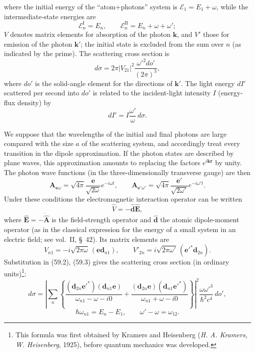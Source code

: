 where the initial energy of the ``atom+photons'' system is $\mathcal E_1=E_1+\omega$, while the intermediate-state energies are
\[
\mathcal E_n^{\mathrm I}=E_n,\qquad
\mathcal E_n^{\mathrm{II}}=E_n+\omega+\omega';
\]
$V$ denotes matrix elements for absorption of the photon $\mathbf k$, and $V'$ those for emission of the photon $\mathbf k'$; the initial state is excluded from the sum over $n$ (as indicated by the prime). The scattering cross section is
\begin{equation}
d\sigma=2\pi|V_{21}|^2\frac{\omega'^2do'}{(2\pi)^3},
\tag{59.3}
\end{equation}
where $do'$ is the solid-angle element for the directions of $\mathbf k'$. The light energy $dI'$ scattered per second into $do'$ is related to the incident-light intensity $I$ (energy-flux density) by
\[
dI'=I\frac{\omega'}{\omega}\,d\sigma.
\]

We suppose that the wavelengths of the initial and final photons are large compared with the size $a$ of the scattering system, and accordingly treat every transition in the dipole approximation. If the photon states are described by plane waves, this approximation amounts to replacing the factors $e^{i\mathbf k\mathbf r}$ by unity. The photon wave functions (in the three-dimensionally transverse gauge) are then
\[
\mathbf A_{\mathbf e\omega}=\sqrt{4\pi}\frac{\mathbf e}{\sqrt{2\omega}}e^{-i\omega t},
\qquad
\mathbf A_{\mathbf e'\omega'}=\sqrt{4\pi}\frac{\mathbf e'}{\sqrt{2\omega'}}e^{-i\omega't}.
\]
Under these conditions the electromagnetic interaction operator can be written
\begin{equation}
\hat V=-\hat{\mathbf d}\hat{\mathbf E},
\tag{59.4}
\end{equation}
where $\hat{\mathbf E}=-\dot{\hat{\mathbf A}}$ is the field-strength operator and $\hat{\mathbf d}$ the atomic dipole-moment operator (as in the classical expression for the energy of a small system in an electric field; see vol.~II, \S~42). Its matrix elements are
\[
V_{n1}=-i\sqrt{2\pi\omega}\,(\mathbf e\mathbf d_{n1}),
\qquad
V'_{2n}=i\sqrt{2\pi\omega'}\,(\mathbf e'^*\mathbf d_{2n}).
\]
Substitution in (59.2), (59.3) gives the scattering cross section (in ordinary units)\footnote{This formula was first obtained by Kramers and Heisenberg (\emph{H. A. Kramers, W. Heisenberg}, 1925), before quantum mechanics was developed.}:
\begin{equation}
d\sigma=\left|\sum_n\left\{
\frac{(\mathbf d_{2n}\mathbf e'^*)(\mathbf d_{n1}\mathbf e)}{\omega_{n1}-\omega-i0}
+\frac{(\mathbf d_{2n}\mathbf e)(\mathbf d_{n1}\mathbf e'^*)}{\omega_{n1}+\omega-i0}
\right\}\right|^2\frac{\omega\omega'^3}{\hbar^2c^4}\,do',
\tag{59.5}
\end{equation}
\[
\hbar\omega_{n1}=E_n-E_1,\qquad \omega'-\omega=\omega_{12}.
\]

